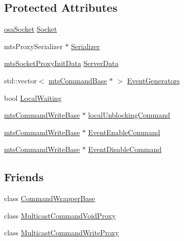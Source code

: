 \subsection*{Protected Attributes}
\begin{DoxyCompactItemize}
\item 
\hyperlink{classosa_socket}{osa\+Socket} \hyperlink{classmts_socket_proxy_client_a324fcc343989f521b7ccd1aa1fec63e9}{Socket}
\item 
mts\+Proxy\+Serializer $\ast$ \hyperlink{classmts_socket_proxy_client_a3f2c24fb49a4fe8a38418792a607cab9}{Serializer}
\item 
\hyperlink{classmts_socket_proxy_init_data}{mts\+Socket\+Proxy\+Init\+Data} \hyperlink{classmts_socket_proxy_client_aa9f989d86d2edd55f50c997b48ffcf74}{Server\+Data}
\item 
std\+::vector$<$ \hyperlink{classmts_command_base}{mts\+Command\+Base} $\ast$ $>$ \hyperlink{classmts_socket_proxy_client_a053c790025eb5df55446f6324937f666}{Event\+Generators}
\item 
bool \hyperlink{classmts_socket_proxy_client_ada937cdc99e0b2c41a569870908968b7}{Local\+Waiting}
\item 
\hyperlink{classmts_command_write_base}{mts\+Command\+Write\+Base} $\ast$ \hyperlink{classmts_socket_proxy_client_a76643549d71e37590b01cab99a19abd2}{local\+Unblocking\+Command}
\item 
\hyperlink{classmts_command_write_base}{mts\+Command\+Write\+Base} $\ast$ \hyperlink{classmts_socket_proxy_client_aa0dc648460a31f901cf8e15b9255c020}{Event\+Enable\+Command}
\item 
\hyperlink{classmts_command_write_base}{mts\+Command\+Write\+Base} $\ast$ \hyperlink{classmts_socket_proxy_client_abf972df3e4ff7d518b4e3ba06503eaba}{Event\+Disable\+Command}
\end{DoxyCompactItemize}
\subsection*{Friends}
\begin{DoxyCompactItemize}
\item 
class \hyperlink{classmts_socket_proxy_client_a1524e007c9e3f37600c0be69f3522b5d}{Command\+Wrapper\+Base}
\item 
class \hyperlink{classmts_socket_proxy_client_a2b26f00ceb33bda446951321904391d1}{Multicast\+Command\+Void\+Proxy}
\item 
class \hyperlink{classmts_socket_proxy_client_a6bc045de34366b8f0b6b2ebb3be2e9df}{Multicast\+Command\+Write\+Proxy}
\end{DoxyCompactItemize}
